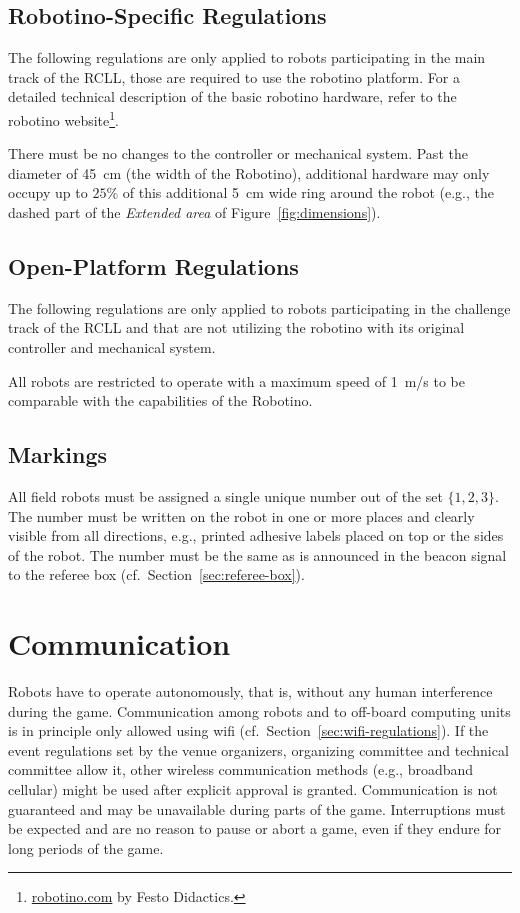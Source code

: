 \documentclass[12pt,twoside]{article}
\newcommand{\refsec}[1]{Section~\ref{#1}}
\newcommand{\reffig}[1]{Figure~\ref{#1}}
\begin{document}
\subsection{Robotino-Specific Regulations}
The following regulations are only applied to robots participating in the
main track of the \ac{RCLL}, those are required to use the robotino platform.
For a detailed technical description of the basic robotino hardware, refer to
the robotino website\footnote{\href{https://robotino.com}{robotino.com} by
Festo Didactics.}.

There must be no changes to the controller or mechanical system.
Past the diameter of \SI{45}{\centi\metre} (the width of the Robotino),
additional hardware may only occupy up to $25\%$ of this
additional \SI{5}{\centi\metre} wide ring around the robot
(e.g., the dashed part of the \emph{Extended area} of \reffig{fig:dimensions}).

\subsection{Open-Platform Regulations}
The following regulations are only applied to robots participating in the
challenge track of the \ac{RCLL} and that are not utilizing the robotino with
its original controller and mechanical system.

All robots are restricted to
operate with a maximum speed of \SI[fraction-function=\dfrac]{1}{\metre/\second}
to be comparable with the capabilities of the Robotino.

\subsection{Markings}
\label{sec:robot-markings}
All field robots must be assigned a single unique number out of the
set $\{1, 2, 3\}$. The number must be written on the robot in one or
more places and clearly visible from all directions, e.g., printed
adhesive labels placed on top or the sides of the robot. The number
must be the same as is announced in the beacon signal to the referee
box (cf.~\refsec{sec:referee-box}).

\section{Communication}
\label{sec:communication}

Robots have to operate autonomously, that is, without any human
interference during the game. Communication among robots and to
off-board computing units is in principle only allowed using wifi
(cf.~\refsec{sec:wifi-regulations}). If the event regulations set by the
venue organizers, organizing committee and technical committee allow it, other
wireless communication methods (e.g., broadband cellular) might be used after
explicit approval is granted.
Communication is not guaranteed
and may be unavailable during parts of the game. Interruptions must be
expected and are no reason to pause or abort a game, even if they
endure for long periods of the game.
\end{document}
